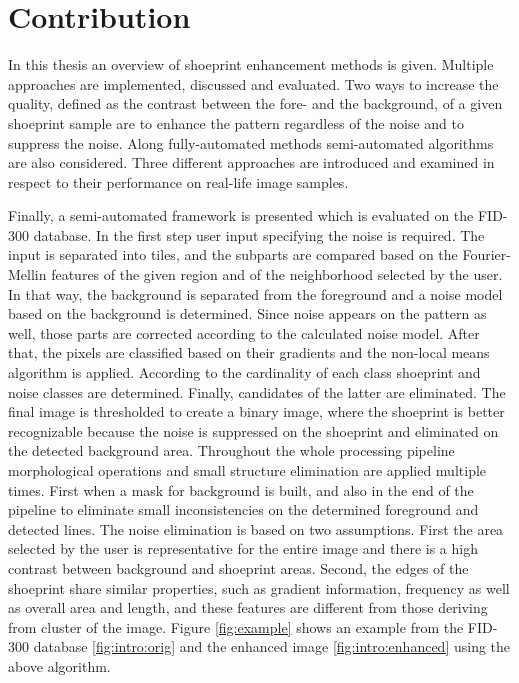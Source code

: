 \documentclass[draft,final]{vutinfth} %
\begin{document}
\section{Contribution}
\par
In this thesis an overview of shoeprint enhancement methods is given.
Multiple approaches are implemented, discussed and evaluated.
Two ways to increase the quality, defined as the contrast between the fore- and the background, of a given shoeprint sample are to enhance the pattern regardless of the noise and to suppress the noise.
Along fully-automated methods semi-automated algorithms are also considered.
Three different approaches are introduced and examined in respect to their performance on real-life image samples.
\par
Finally, a semi-automated framework is presented which is evaluated on the FID-300 database.
In the first step user input specifying the noise is required.
The input is separated into tiles, and the subparts are compared based on the Fourier-Mellin features of the given region and of the neighborhood selected by the user.
In that way, the background is separated from the foreground and a noise model based on the background is determined.
Since noise appears on the pattern as well, those parts are corrected according to the calculated noise model.
After that, the pixels are classified based on their gradients and the non-local means algorithm is applied.
According to the cardinality of each class shoeprint and noise classes are determined.
Finally, candidates of the latter are eliminated.
The final image is thresholded to create a binary image, where the shoeprint is better recognizable because the noise is suppressed on the shoeprint and eliminated on the detected background area.
Throughout the whole processing pipeline morphological operations and small structure elimination are applied multiple times. 
First when a mask for background is built, and also in the end of the pipeline to eliminate small inconsistencies on the determined foreground and detected lines. 
The noise elimination is based on two assumptions.
First the area selected by the user is representative for the entire image and there is a high contrast between background and shoeprint areas.
Second, the edges of the shoeprint share similar properties, such as gradient information, frequency as well as overall area and length, and these features are different from those deriving from cluster of the image.
Figure \ref{fig:example} shows an example from the FID-300 database \ref{fig:intro:orig} and the enhanced image \ref{fig:intro:enhanced} using the above algorithm.
\end{document}
